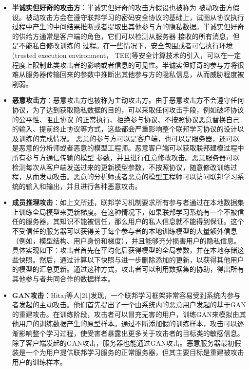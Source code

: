 \begin{itemize}

\item \textbf{半诚实但好奇的攻击方}：半诚实但好奇的攻击方假设也被称为 被动攻击方假设。被动攻击方会在遵守联邦学习的密码安全协议的基础上，试图从协议执行过程中产生的中间结果推断或者提取出其他参与方的隐私数据。半诚实但好奇的供给方通常是客户端的角色，它们可以检测从服务器 接收的所有消息，但是不能私自修改训练的 过程。在一些情况下，安全包围或者可信执行环境(trusted execution environment， TEE)等安全计算技术的引入，可以在一定程度上限制此类攻击者的影响或者信息的可见性。半诚实但好奇的参与方将很难从服务器传输回来的参数中推断出其他参与方的隐私信息，从而威胁程度被削弱。

\item \textbf{恶意攻击方}：恶意攻击方也被称为主动攻击方。由于恶意攻击方不会遵守任何协议，为了达到获取隐私数据的目的，可以采取任何攻击手段，例如破坏协议的公平性、阻止协议 的正常执行、拒绝参与协议、不按照协议恶意替换自己的输入、提前终止协议等方式，这些都会严重影响整个联邦学习协议的设计以及训练的完成情况。
恶意的参与方可以是客户端，也可以是服务器，还可以是恶意的分析师或者恶意的模型工程师。恶意客户端可以获取联邦建模过程中所有参与方通信传输的模型 参数，并且进行任意修改攻击。恶意服务器可以检测每次从客户端发送过来的更新模型参数，不按照协议，随意修改训练过程，从而发动攻击。恶意的分析师或者恶意的模型工程师可以访问联邦学习系统的输入和输出，并且进行各种恶意攻击。

\item \textbf{成员推理攻击}：如上文所述，联邦学习机制要求所有参与者通过在本地数据集上训练全局模型来更新梯度。在这种情况下，如果联邦学习系统有一个不被信任的服务器，其知识不能被信任，那么用户的私人信息就不能得到保证。这个不受信任的服务器可以获得关于每个参与者的本地训练模型的大量额外信息（例如，模型结构、用户身份和梯度），并且能够充分损害用户的隐私信息。具体实现如下：攻击者首先在平均化后获得模型的全局参数，并在本地存储这些快照。然后，通过计算以下快照与进一步删除添加的更新，以获得其他用户的模型的汇总更新。通过这种方式，攻击者可以利用数据集的协助，得出所有其他参与者共同合作的数据样本。

\item \textbf{GAN攻击}：Hitaj等人[21]发现，一个联邦学习框架非常容易受到系统内参与者发起的主动攻击。他们首先提出了一个由系统内的恶意用户发起的基于GAN的重建攻击。在训练阶段，攻击者可以冒充无害的用户，训练GAN来模拟由其他用户的训练数据产生的原型样本。通过不断添加假的训练样本，攻击可以逐渐影响整个学习过程，使受害者暴露出更多关于攻击者的目标类的敏感信息。除了客户端发起的GAN攻击，服务器也能通过GAN攻击。恶意服务器最初假装是一个为用户提供联邦学习服务的正常服务器，但其主要目标是重建被攻击用户的训练样本。

\end{itemize}


